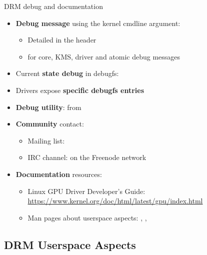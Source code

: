 \begin{frame}[fragile]{DRM debug and documentation}
  \begin{itemize}
  \item \textbf{Debug message} using the  kernel cmdline argument:
    \begin{itemize}
    \item Detailed in the  header
    \item {} for core, KMS, driver and atomic debug messages
    \end{itemize}
  \item Current \textbf{state debug} in debugfs: 
  \item Drivers expose \textbf{specific debugfs entries}
  \item \textbf{Debug utility}:  from 
  \item \textbf{Community} contact:
    \begin{itemize}
    \item Mailing list: 
    \item IRC channel:  on the Freenode network
    \end{itemize}
  \item \textbf{Documentation} resources:
    \begin{itemize}
    \item Linux GPU Driver Developer’s Guide: \url{https://www.kernel.org/doc/html/latest/gpu/index.html}
    \item Man pages about userspace aspects: , , 
    \end{itemize}
  \end{itemize}
\end{frame}

\subsection{DRM Userspace Aspects}

